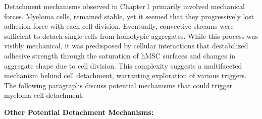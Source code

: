 \unnsubsection{\caddtriggertitle}%
\label{sec:discussion_caddtrigger}%
Detachment mechanisms observed in Chapter\,1 primarily involved mechanical
forces. Myeloma cells,  remained stable,
yet it seemed that they progressively lost adhesion force with each cell
division. Eventually, convective streams were sufficient to detach single \INA
cells from homotypic aggregates. While this process was visibly mechanical, it
was predisposed by cellular interactions that destabilized adhesive strength
through the saturation of hMSC surfaces and changes in aggregate shape due to
cell division. This complexity suggests a multifaceted mechanism behind cell
detachment, warranting exploration of various triggers. The following paragraphs
discuss potential mechanisms that could trigger myeloma cell detachment.

\noindent\textbf{Other Potential Detachment Mechanisms:}%

